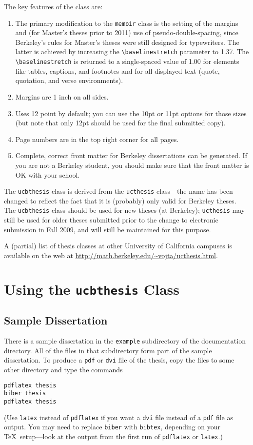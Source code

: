\documentclass[11pt]{article}
\newcommand*{\pkg}[1]{\texttt{#1}}
\begin{document}
\smallbreak
The key features of the class are:
\begin{enumerate}
\item The primary modification to the \pkg{memoir} class is the setting of the
  margins and (for Master's theses prior to 2011) use of pseudo-double-spacing,
  since Berkeley's rules for Master's theses were still designed
  for typewriters.  The latter is achieved by increasing the
  \verb|\baselinestretch| parameter to 1.37.  The \verb|\baselinestretch|
  is returned to a single-spaced value of 1.00 for elements like tables,
  captions, and footnotes and for all displayed text (quote, quotation,
  and verse environments).
\item Margins are 1 inch on all sides.
\item Uses 12 point by default; you can use the 10pt or 11pt options for
  those sizes (but note that only 12pt should be used for the final
  submitted copy).
\item Page numbers are in the top right corner for all pages.
\item Complete, correct front matter for Berkeley dissertations can be
  generated.  If you are not a Berkeley student, you should make sure
  that the front matter is OK with your school.
\end{enumerate}

The \pkg{ucbthesis} class is derived from the \pkg{ucthesis} class---the
name has been changed to reflect the fact that it is (probably) only
valid for Berkeley theses.
The \pkg{ucbthesis} class should be used for new theses (at Berkeley);
\pkg{ucthesis} may still be used for older theses submitted prior to the
change to electronic submission in Fall 2009, and will still be maintained
for this purpose.

A (partial) list of thesis classes at other University of California
campuses is available on the web at
\url{http://math.berkeley.edu/~vojta/ucthesis.html}.

\section{Using the \pkg{ucbthesis} Class}

\subsection{Sample Dissertation}

There is a sample dissertation in the \texttt{example} subdirectory
of the documentation directory.  All of the files in that subdirectory
form part of the sample dissertation.  To produce a \texttt{pdf} or
\texttt{dvi} file of the thesis, copy the files to some other directory
and type the commands
\begin{lstlisting}
pdflatex thesis
biber thesis
pdflatex thesis
\end{lstlisting}
(Use \texttt{latex} instead of \texttt{pdflatex} if you want a \texttt{dvi}
file instead of a \texttt{pdf} file as output.  You may need to replace
\texttt{biber} with \texttt{bibtex}, depending on your \TeX\ setup---look
at the output from the first run of \pkg{pdflatex} or \pkg{latex}.)
\end{document}
